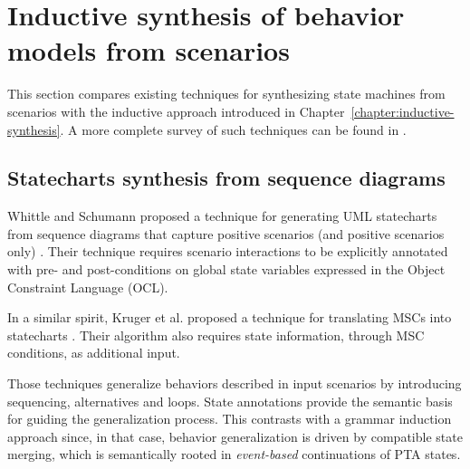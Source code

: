 \section{Inductive synthesis of behavior models from scenarios\label{section:related-from-scenarios}}

This section compares existing techniques for synthesizing state machines from scenarios with the inductive approach introduced in Chapter~\ref{chapter:inductive-synthesis}. A more complete survey of such techniques can be found in \cite{Liang:2006}.


\subsection{Statecharts synthesis from sequence diagrams}

Whittle and Schumann proposed a technique for generating UML statecharts from sequence diagrams that capture positive scenarios (and positive scenarios only) \cite{Whittle:2000}. Their technique requires scenario interactions to be explicitly annotated with pre- and post-conditions on global state variables expressed in the Object Constraint Language (OCL). 

In a similar spirit, Kruger et al. proposed a technique for translating MSCs into statecharts \cite{Kruger:2000}. Their algorithm also requires state information, through MSC conditions, as additional input.

Those techniques generalize behaviors described in input scenarios by introducing sequencing, alternatives and loops. State annotations provide the semantic basis for guiding the generalization process. This contrasts with a grammar induction approach since, in that case, behavior generalization is driven by compatible state merging, which is semantically rooted in \emph{event-based} continuations of PTA states. 

